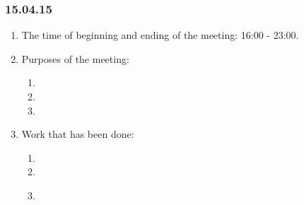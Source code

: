 \subsubsection{15.04.15}
\begin{enumerate}
	
	\item The time of beginning and ending of the meeting: 16:00 - 23:00.
	
	\item Purposes of the meeting: 
	\begin{enumerate}
		
		\item 
		
		\item 
		
        \item 
		
	\end{enumerate}

	\item Work that has been done:
	\begin{enumerate}
		
		\item 
		
		\item 
		
        \item 
		
        \begin{figure}[H]
	  	  \begin{minipage}[h]{0.2\linewidth}
	  	    \center  
	  	  \end{minipage}
	  	  \begin{minipage}[h]{0.6\linewidth}
	  		\caption{}
	  	  \end{minipage}
	   \end{figure}


\end{enumerate}
\end{enumerate}
